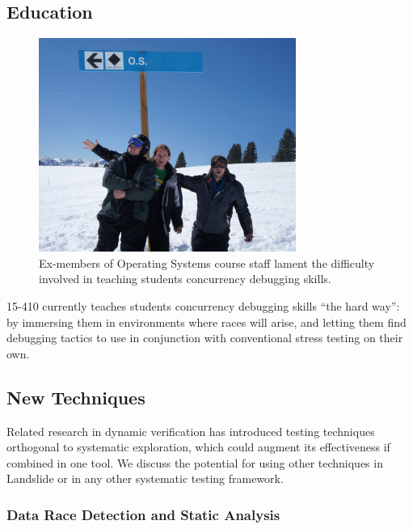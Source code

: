 \subsection{Education}
\label{sec:future-education}

\begin{figure}[h]
	\begin{center}
	\includegraphics[width=0.75\textwidth]{wont-modify-vail.jpg}
	\end{center}
	\caption{Ex-members of Operating Systems course staff lament the difficulty involved in teaching students concurrency debugging skills.}
\end{figure}

15-410 currently teaches students concurrency debugging skills ``the hard way'': by immersing them in environments where races will arise, and letting them find debugging tactics to use in conjunction with conventional stress testing on their own.

\subsection{New Techniques}
\label{sec:future-new}

Related research in dynamic verification has introduced testing techniques orthogonal to systematic exploration, which could augment its effectiveness if combined in one tool. We discuss the potential for using other techniques in Landslide or in any other systematic testing framework.

\subsubsection{Data Race Detection and Static Analysis}
\label{sec:future-analysis}

